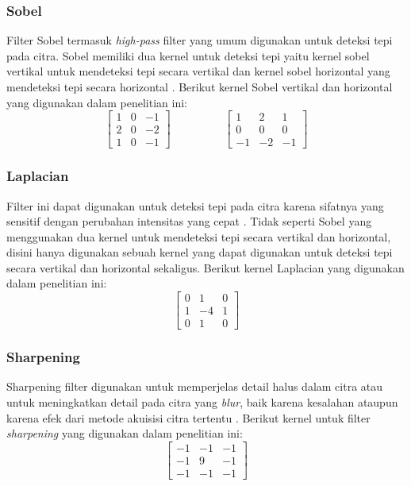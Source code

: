 \subsubsection{Sobel}
Filter Sobel termasuk \textit{high-pass} filter yang umum digunakan untuk deteksi tepi pada citra. Sobel memiliki dua kernel untuk deteksi tepi yaitu kernel sobel vertikal untuk mendeteksi tepi secara vertikal dan kernel sobel horizontal yang mendeteksi tepi secara horizontal \cite{pdf:marcin}. Berikut kernel Sobel vertikal dan horizontal yang digunakan dalam penelitian ini:
\begin{equation}
    \label{kernel:sobel}
    \left[
    \begin{matrix}
 1 & 0 & -1 \\
 2 & 0 & -2 \\
 1 & 0 & -1
    \end{matrix}
    \right]
    \hspace{2cm}
    \left[
 \begin{matrix}
 1 & 2 & 1 \\
 0 & 0 & 0 \\
 -1 & -2 & -1
    \end{matrix}
    \right]
\end{equation}

\subsubsection{Laplacian}
Filter ini dapat digunakan untuk deteksi tepi pada citra karena sifatnya yang sensitif dengan perubahan intensitas yang cepat \cite{pdf:jingbo}. Tidak seperti Sobel yang menggunakan dua kernel untuk mendeteksi tepi secara vertikal dan horizontal, disini hanya digunakan sebuah kernel yang dapat digunakan untuk deteksi tepi secara vertikal dan horizontal sekaligus. Berikut kernel Laplacian yang digunakan dalam penelitian ini:
\begin{equation}
    \label{kernel:laplacian}
    \left[
    \begin{matrix}
 0 & 1 & 0 \\
 1 & -4 & 1 \\
 0 & 1 & 0
    \end{matrix}
    \right]
\end{equation}

\subsubsection{Sharpening}
Sharpening filter digunakan untuk memperjelas detail halus dalam citra atau untuk meningkatkan detail pada citra yang \textit{blur}, baik karena kesalahan ataupun karena efek dari metode akuisisi citra tertentu \cite{pdf:ching}. Berikut kernel untuk filter \textit{sharpening} yang digunakan dalam penelitian ini:
\begin{equation}
    \label{kernel:sharpen}
    \left[
    \begin{matrix}
 -1 & -1 & -1 \\
 -1 & 9 & -1 \\
 -1 & -1 & -1
    \end{matrix}
    \right]
\end{equation}


